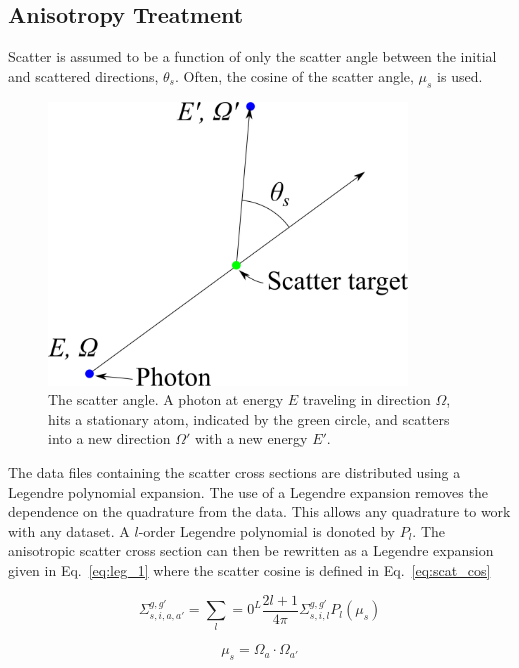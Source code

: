 \subsection{Anisotropy Treatment}

Scatter is assumed to be a function of only the scatter angle between the initial and scattered directions, $\theta_s$. Often, the cosine of the scatter angle, $\mu_s$ is used.

\begin{figure}[tb]
  \begin{center}
   \includegraphics[width=3.75in]{figs/scat_ang}
  \end{center}
  \caption{The scatter angle. A photon at energy $E$ traveling in direction $\Omega$, hits a stationary atom, indicated by the green circle, and scatters into a new direction $\Omega'$ with a new energy $E'$.}
\label{fig:scat_ang}
\end{figure}%

The data files containing the scatter cross sections are distributed using a Legendre polynomial expansion. The use of a Legendre expansion removes the dependence on the quadrature from the data. This allows any quadrature to work with any dataset. A $l$-order Legendre polynomial is donoted by $P_l$. The anisotropic scatter cross section can then be rewritten as a Legendre expansion given in Eq.~\ref{eq:leg_1} where the scatter cosine is defined in Eq.~\ref{eq:scat_cos}

\begin{equation} \label{eq:leg_1}
\Sigma_{s, i, a, a'}^{g, g'} = \sum_l=0^L \frac{2l+1}{4 \pi}\Sigma_{s, i, l}^{g, g'} P_l(\mu_s)
\end{equation}

\begin{equation} \label{eq:scat_cos}
\mu_s = \Omega_a \cdot \Omega_{a'}
\end{equation}

\endinput
